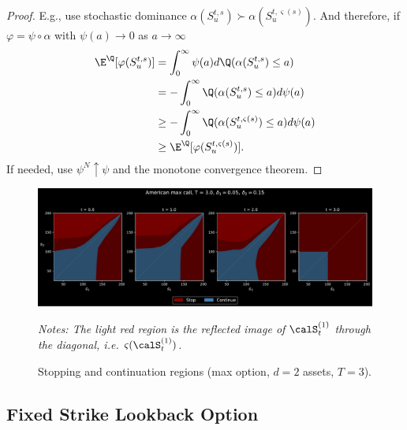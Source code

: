 \begin{proof}
E.g., use stochastic dominance $\alpha(S^{t,s}_{u}) \succ \alpha(S^{t,\varsigma(s)}_{u})$. And therefore, if $\varphi = \psi \circ \alpha$ with $\psi(a) \to 0$ as $a\to \infty$
\begin{align*}
    \E^{\Q}[\varphi(S^{t,s}_{u}) ] &= \int_0^{\infty} \psi(a) d\Q(\alpha(S^{t,s}_{u}) \le a) \\ 
    &=  - \int_0^{\infty} \Q(\alpha(S^{t,s}_{u}) \le a) d \psi(a) \\ 
    &\ge  - \int_0^{\infty} \Q(\alpha(S^{t,\varsigma(s)}_{u}) \le a) d \psi(a) \\ 
     &\ge  \E^{\Q}[\varphi(S^{t,\varsigma(s)}_{u}) ].
\end{align*}
 If needed,  use $\psi^N \uparrow \psi$  and the monotone convergence theorem.  
\end{proof}

\begin{figure}
    \centering
    \caption{Stopping and continuation regions (max option, $d=2$ assets, $T=3$).}
    \includegraphics[scale = 0.42]{FB/Figures/AsymMaxCall.pdf}
    \label{fig:asymCall}
    
    \scriptsize{
\textit{Notes: The light red region is the reflected image of $\calS_t^{(1)}$ through the diagonal, i.e. $\varsigma(\calS_t^{(1)})$.}} %
\end{figure}

\subsection{Fixed Strike  Lookback Option} \label{sec:Lkbk}


